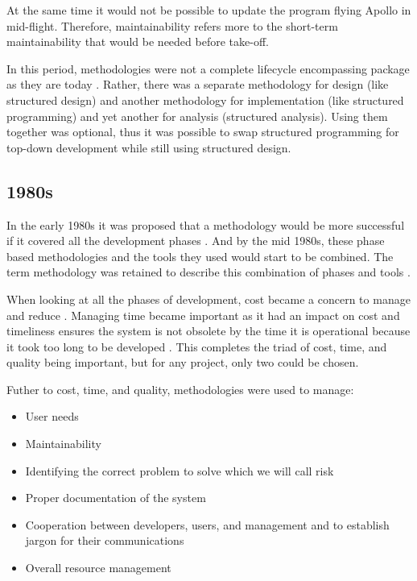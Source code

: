 At the same time it would not be possible to update the program flying Apollo in mid-flight. 
Therefore, maintainability refers more to the short-term maintainability that would be needed before take-off.

In this period, methodologies were not a complete lifecycle encompassing package as they are today \cite{soi_1982, beregi_1985}.
Rather, there was a separate methodology for design (like structured design) and another methodology for implementation (like structured programming) and yet another for analysis (structured analysis).
Using them together was optional, thus it was possible to swap structured programming for top-down development while still using structured design. \cite{yourdon_1977}

\subsection{1980s}
In the early 1980s it was proposed that a methodology would be more successful if it covered all the development phases \cite{soi_1982}.
And by the mid 1980s, these phase based methodologies and the tools they used would start to be combined.
The term methodology was retained to describe this combination of phases and tools \cite{beregi_1985}. 

When looking at all the phases of development, cost became a concern to manage and reduce \cite{vanderlei_1983, peacham_1985, loesh_1985}.
Managing time became important as it had an impact on cost and timeliness ensures the system is not obsolete by the time it is operational because it took too long to be developed \cite{peacham_1985, beregi_1985, mannino_1987, paul_1993}.
This completes the triad of cost, time, and quality being important, but for any project, only two could be chosen.

Futher to cost, time, and quality, methodologies were used to manage:
\begin{itemize}
    \item User needs \cite{peacham_1985}
    \item Maintainability \cite{peacham_1985}
    \item Identifying the correct problem to solve which we will call risk \cite{peacham_1985}
    \item Proper documentation of the system \cite{loesh_1985}
    \item Cooperation between developers, users, and management and to establish jargon for their communications \cite{loesh_1985}
    \item Overall resource management \cite{mannino_1987}
\end{itemize}

